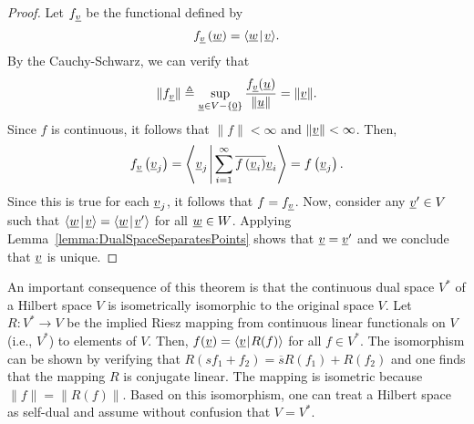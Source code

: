 \begin{proof}
Let $f_{\underline{v}}$ be the functional defined by
\begin{equation*}
f_{\underline{v}} \left( \underline{w} \right) = {\left\langle  \underline{w}  \mskip2mu \middle| \mskip2mu  \underline{v}  \right\rangle} .
\end{equation*}
By the Cauchy-Schwarz, we can verify that
\[ \| f_{\underline{v}} \| \triangleq \sup_{\underline{u}\in V - \{ \underline{0} \}} \frac{f_{\underline{v}} (\underline{u})}{\| \underline{u} \|} = \| \underline{v} \|. \]
Since $f$ is continuous, it follows that $\| f \| < \infty$ and $\| \underline{v} \| < \infty$.
Then, 
\begin{equation*}
f_{\underline{v}} \left( \underline{v}_j \right) = {\left\langle  \underline{v}_j  \mskip2mu \middle| \mskip2mu  \sum_{i=1}^\infty \overline{f \left( \underline{v}_i \right)} \underline{v}_i  \right\rangle}
= f \left( \underline{v}_j \right) .
\end{equation*}
Since this is true for each $\underline{v}_j$, it follows that $f = f_{\underline{v}}$.
Now, consider any $\underline{v}' \in V$ such that ${\left\langle  \underline{w}  \mskip2mu \middle| \mskip2mu  \underline{v}  \right\rangle} = {\left\langle  \underline{w}  \mskip2mu \middle| \mskip2mu  \underline{v}'  \right\rangle}$ for all $\underline{w} \in W$.
Applying Lemma~\ref{lemma:DualSpaceSeparatesPoints} shows that $\underline{v} = \underline{v}'$ and we conclude that $\underline{v}$ is unique.
\end{proof}

An important consequence of this theorem is that the continuous dual space $V^*$ of a Hilbert space $V$ is isometrically isomorphic to the original space $V$.
Let $R \colon V^* \rightarrow V$ be the implied Riesz mapping from continuous linear functionals on $V$ (i.e., $V^*$) to elements of $V$.
Then, $f(\underline{v}) = {\langle  \underline{v}  \mskip1mu | \mskip1mu  R( f )  \rangle}$ for all $f \in V^*$.
The isomorphism can be shown by verifying that $R( s f_1 + f_2 ) = \overline{s} R(f_1) + R(f_2)$ and one finds that the mapping $R$ is conjugate linear.
The mapping is isometric because $\| f \| = \| R(f) \|$.
Based on this isomorphism, one can treat a Hilbert space as self-dual and assume without confusion that $V=V^*$.


